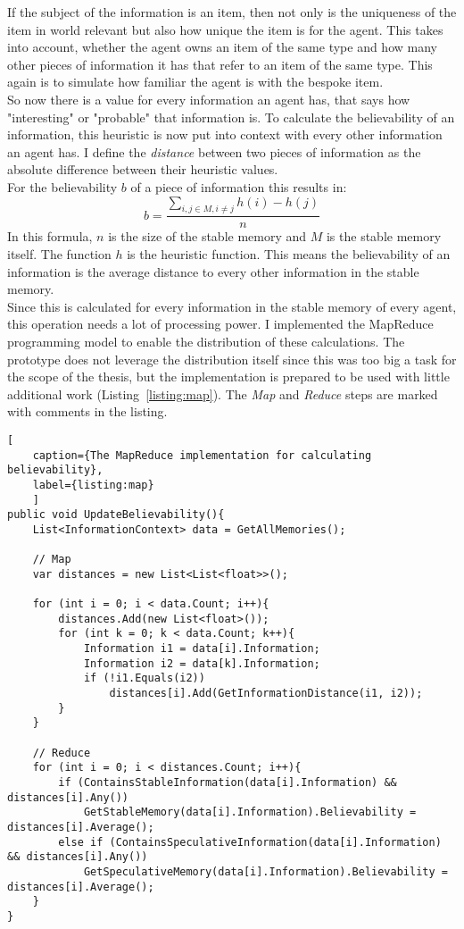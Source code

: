 If the subject of the information is an item, then not only is the uniqueness of the item in world relevant but also how unique the item is for the agent. This takes into account, whether the agent owns an item of the same type and how many other pieces of information it has that refer to an item of the same type. This again is to simulate how familiar the agent is with the bespoke item.\\
So now there is a value for every information an agent has, that says how "interesting" or "probable" that information is. To calculate the believability of an information, this heuristic is now put into context with every other information an agent has. I define the \textit{distance} between two pieces of information as the absolute difference between their heuristic values.\\
For the believability $b$ of a piece of information this results in:
\begin{equation}
	b = \frac{\sum_{i,j \in M, i \neq j} h(i)-h(j)}{n}
\end{equation}
In this formula, $n$ is the size of the stable memory and $M$ is the stable memory itself. The function $h$ is the heuristic function. This means the believability of an information is the average distance to every other information in the stable memory.\\
Since this is calculated for every information in the stable memory of every agent, this operation needs a lot of processing power. I implemented the MapReduce programming model to enable the distribution of these calculations. The prototype does not leverage the distribution itself since this was too big a task for the scope of the thesis, but the implementation is prepared to be used with little additional work (Listing~\ref{listing:map}). The \textit{Map} and \textit{Reduce} steps are marked with comments in the listing.
\begin{lstlisting}[
	caption={The MapReduce implementation for calculating believability},
	label={listing:map}
	]
public void UpdateBelievability(){
	List<InformationContext> data = GetAllMemories();
	
	// Map
	var distances = new List<List<float>>();
	
	for (int i = 0; i < data.Count; i++){
		distances.Add(new List<float>());
		for (int k = 0; k < data.Count; k++){
			Information i1 = data[i].Information;
			Information i2 = data[k].Information;
			if (!i1.Equals(i2))
				distances[i].Add(GetInformationDistance(i1, i2));
		}
	}
	
	// Reduce
	for (int i = 0; i < distances.Count; i++){
		if (ContainsStableInformation(data[i].Information) && distances[i].Any())
			GetStableMemory(data[i].Information).Believability = distances[i].Average();
		else if (ContainsSpeculativeInformation(data[i].Information) && distances[i].Any())
			GetSpeculativeMemory(data[i].Information).Believability = distances[i].Average();
	}
}
\end{lstlisting}
